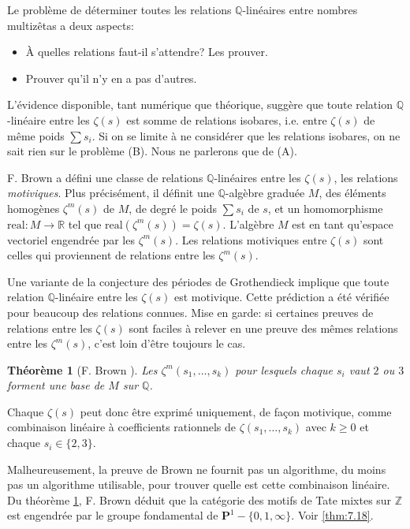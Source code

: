 \documentclass[11pt,a4paper]{article}
\theoremstyle{plain}
\newtheorem{theorem}{Th\'eor\`eme}
\theoremstyle{definition}
\newcommand{\Z}{\mathbb{Z}}
\newcommand{\Q}{\mathbb{Q}}
\newcommand{\R}{\mathbb{R}}
\begin{document}
Le probl\`eme de d\'eterminer toutes les relations $\Q$-lin\'eaires entre nombres multiz\^etas a deux aspects:
\begin{itemize}
\item[(A)] \`A quelles relations faut-il s'attendre? Les prouver.
\item[(B)] Prouver qu'il n'y en a pas d'autres.
\end{itemize}

L'\'evidence disponible, tant num\'erique que th\'eorique, sugg\`ere que toute relation $\Q$-lin\'eaire entre les $\zeta(s)$ est somme de relations isobares, i.e. entre $\zeta(s)$ de m\^eme poids $\sum s_i$. Si on se limite \`a ne consid\'erer que les relations isobares, on ne sait rien sur le probl\`eme (B). Nous ne parlerons que de (A).

F. Brown a d\'efini une classe de relations $\Q$-lin\'eaires entre les $\zeta(s)$, les relations \emph{motiviques}. Plus pr\'ecis\'ement, il d\'efinit une $\Q$-alg\`ebre gradu\'ee $M$, des \'el\'ements homog\`enes $\zeta^m(s)$ de $M$, de degr\'e le poids $\sum s_i$ de $s$, et un homomorphisme $\mathrm{real} : M \to \R$ tel que $\mathrm{real}(\zeta^m(s)) = \zeta(s)$. L'alg\`ebre $M$ est en tant qu'espace vectoriel engendr\'ee par les $\zeta^m(s)$. Les relations motiviques entre $\zeta(s)$ sont celles qui proviennent de relations entre les $\zeta^m(s)$.

Une variante de la conjecture des p\'eriodes de Grothendieck implique que toute relation $\Q$-lin\'eaire entre les $\zeta(s)$ est motivique. Cette pr\'ediction a \'et\'e v\'erifi\'ee pour beaucoup des relations connues. Mise en garde: si certaines preuves de relations entre les $\zeta(s)$ sont faciles \`a relever en une preuve des m\^emes relations entre les $\zeta^m(s)$, c'est loin d'\^etre toujours le cas.

\begin{theorem}[F. Brown {\cite{Brown}}]\label{thm:0.2}
Les $\zeta^m(s_1,\ldots,s_k)$ pour lesquels chaque $s_i$ vaut $2$ ou $3$ forment une base de $M$ sur $\Q$.
\end{theorem}

Chaque $\zeta(s)$ peut donc \^etre exprim\'e uniquement, de fa\c{c}on motivique, comme combinaison lin\'eaire \`a coefficients rationnels de $\zeta(s_1,\ldots,s_k)$ avec $k \geq 0$ et chaque $s_i \in \{2,3\}$.

Malheureusement, la preuve de Brown ne fournit pas un algorithme, du moins pas un algorithme utilisable, pour trouver quelle est cette combinaison lin\'eaire. Du th\'eor\`eme \ref{thm:0.2}, F. Brown d\'eduit que la cat\'egorie des motifs de Tate mixtes sur $\Z$ est engendr\'ee par le groupe fondamental de $\mathbf{P}^1 - \{0,1,\infty\}$. Voir \ref{thm:7.18}.
\end{document}
